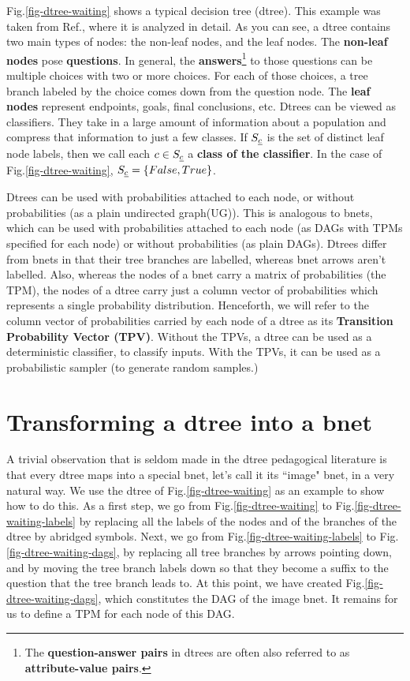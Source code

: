 Fig.\ref{fig-dtree-waiting}
shows a typical decision tree (dtree).
This example was taken
from Ref.\cite{stu-nor-book},
where it is analyzed
in detail.
As you can see,
a dtree contains two main types
of nodes: the non-leaf nodes,
and the leaf nodes.
The {\bf non-leaf nodes} pose
{\bf questions}. In general,
the {\bf answers}\footnote
{The {\bf question-answer pairs}
in dtrees are often
also referred to as 
{\bf attribute-value pairs}.}
 to those
questions can
be multiple choices with
two or more choices.
For each of those choices,
a tree branch labeled by the choice
 comes down from the 
question node.
The {\bf leaf nodes} represent
endpoints, goals, final
conclusions, etc.
Dtrees can be viewed
as classifiers. They
take in a large amount 
of information about a population 
and compress that information
to just a few classes.
If $S_{\underline{c}}$ is the 
set of distinct leaf node labels,
then we call each
$c\in S_{\underline{c}}$
a  {\bf class of the classifier}.
In the case of
Fig.\ref{fig-dtree-waiting},
$S_{\underline{c}}=\{False, True\}$.

Dtrees can be used 
with
probabilities attached to each node, or without
probabilities
(as a
plain undirected graph(UG)).
This is analogous to bnets,
which can be used with
probabilities attached to each node
 (as DAGs with
TPMs specified for each node) or without
probabilities (as plain
DAGs).
Dtrees differ 
from bnets in that
their tree branches 
are labelled, whereas bnet arrows
 aren't labelled.
Also,
whereas the nodes of
a bnet carry a matrix of 
probabilities (the TPM),
the nodes of a dtree carry
just a column vector
of probabilities
which represents
a single 
probability distribution.
Henceforth,
we will refer to
the column vector
of probabilities
carried by each node of a dtree
as its {\bf Transition
Probability Vector (TPV)}.
Without the TPVs,
a dtree can be used 
as a deterministic classifier,
to classify inputs.
With the TPVs,
it can be used as a 
probabilistic sampler (to generate
random samples.)

\section{Transforming a dtree into a bnet}
A trivial 
observation
that is seldom made
in the dtree pedagogical literature
is that every dtree 
maps into a special bnet, 
let's call it
its ``image" bnet,
in a very natural way.
We use the dtree
of Fig.\ref{fig-dtree-waiting}
as an example to show 
how to do this. As 
a first 
step,
we go from
Fig.\ref{fig-dtree-waiting}
to
Fig.\ref{fig-dtree-waiting-labels}
by
replacing
all the labels of the
nodes and of the branches of
the dtree 
by abridged symbols. 
Next, we go 
from Fig.\ref{fig-dtree-waiting-labels}
to Fig.\ref{fig-dtree-waiting-dags},
by replacing all tree branches 
by arrows pointing down,
 and by
moving the tree branch labels 
down so that they
become a suffix to the question 
that the tree branch leads to.
At this point,
we have created
Fig.\ref{fig-dtree-waiting-dags},
which constitutes
the DAG of the image bnet.
It remains for us to define
a TPM for each node
of this DAG.

